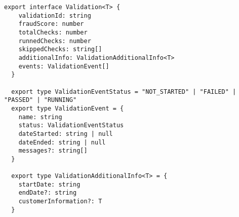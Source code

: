     \begin{lstlisting}[style=es6, caption={TypeScript interface of a validation result (TypeScript)}]
  export interface Validation<T> {
    validationId: string
    fraudScore: number
    totalChecks: number
    runnedChecks: number
    skippedChecks: string[]
    additionalInfo: ValidationAdditionalInfo<T>
    events: ValidationEvent[]
  }

  export type ValidationEventStatus = "NOT_STARTED" | "FAILED" | "PASSED" | "RUNNING"
  export type ValidationEvent = {
    name: string
    status: ValidationEventStatus
    dateStarted: string | null
    dateEnded: string | null
    messages?: string[]
  }

  export type ValidationAdditionalInfo<T> = {
    startDate: string
    endDate?: string
    customerInformation?: T
  }
    \end{lstlisting}